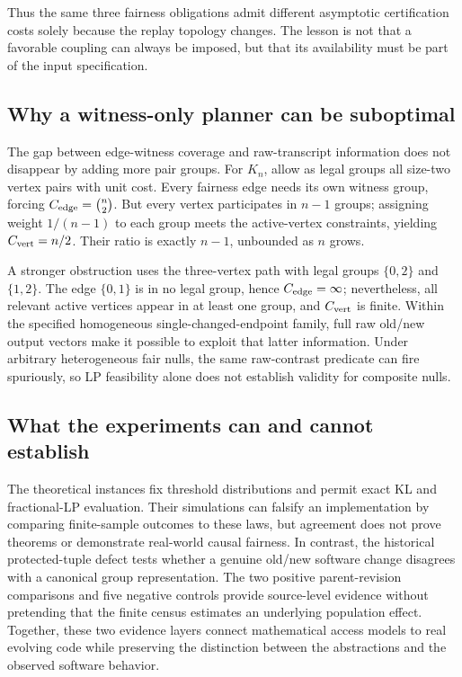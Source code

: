 Thus the same three fairness obligations admit different asymptotic certification costs solely because the replay topology changes. The lesson is not that a favorable coupling can always be imposed, but that its availability must be part of the input specification.

\subsection{Why a witness-only planner can be suboptimal}
The gap between edge-witness coverage and raw-transcript information does not disappear by adding more pair groups. For $K_n$, allow as legal groups all size-two vertex pairs with unit cost. Every fairness edge needs its own witness group, forcing $C_{\rm edge}=\binom n2$. But every vertex participates in $n-1$ groups; assigning weight $1/(n-1)$ to each group meets the active-vertex constraints, yielding $C_{\rm vert}=n/2$. Their ratio is exactly $n-1$, unbounded as $n$ grows.

A stronger obstruction uses the three-vertex path with legal groups $\{0,2\}$ and $\{1,2\}$. The edge $\{0,1\}$ is in no legal group, hence $C_{\rm edge}=\infty$; nevertheless, all relevant active vertices appear in at least one group, and $C_{\rm vert}$ is finite. Within the specified homogeneous single-changed-endpoint family, full raw old/new output vectors make it possible to exploit that latter information. Under arbitrary heterogeneous fair nulls, the same raw-contrast predicate can fire spuriously, so LP feasibility alone does not establish validity for composite nulls.

\subsection{What the experiments can and cannot establish}
The theoretical instances fix threshold distributions and permit exact KL and fractional-LP evaluation. Their simulations can falsify an implementation by comparing finite-sample outcomes to these laws, but agreement does not prove theorems or demonstrate real-world causal fairness. In contrast, the historical protected-tuple defect tests whether a genuine old/new software change disagrees with a canonical group representation. The two positive parent-revision comparisons and five negative controls provide source-level evidence without pretending that the finite census estimates an underlying population effect. Together, these two evidence layers connect mathematical access models to real evolving code while preserving the distinction between the abstractions and the observed software behavior.


